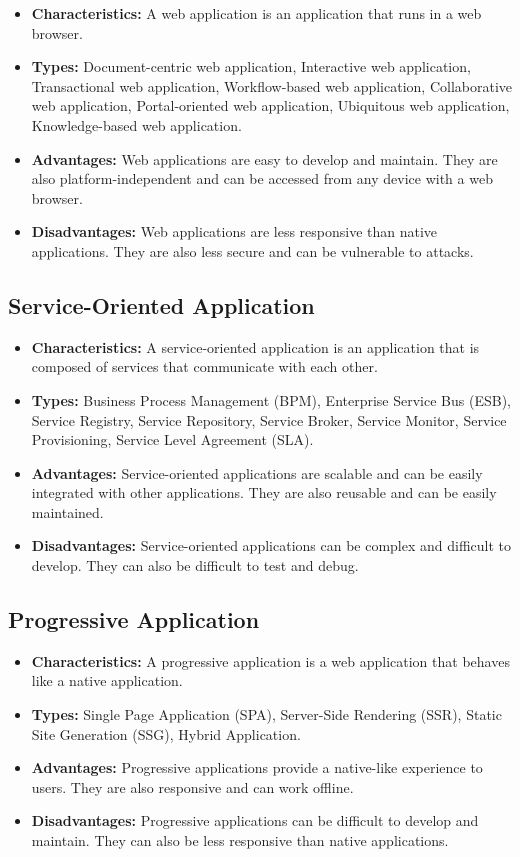 \documentclass{IEEEtran}
\begin{document}
	\begin{itemize}
		\item \textbf{Characteristics:} A web application is an application that runs in a web browser.
		\item \textbf{Types:} Document-centric web application, Interactive web application, Transactional web application, Workflow-based web application, Collaborative web application, Portal-oriented web application, Ubiquitous web application, Knowledge-based web application.
		\item \textbf{Advantages:} Web applications are easy to develop and maintain. They are also platform-independent and can be accessed from any device with a web browser.
		\item \textbf{Disadvantages:} Web applications are less responsive than native applications. They are also less secure and can be vulnerable to attacks.
	\end{itemize}
	
	\subsection{Service-Oriented Application}
	
	\begin{itemize}
		\item \textbf{Characteristics:} A service-oriented application is an application that is composed of services that communicate with each other.
		\item \textbf{Types:} Business Process Management (BPM), Enterprise Service Bus (ESB), Service Registry, Service Repository, Service Broker, Service Monitor, Service Provisioning, Service Level Agreement (SLA).
		\item \textbf{Advantages:} Service-oriented applications are scalable and can be easily integrated with other applications. They are also reusable and can be easily maintained.
		\item \textbf{Disadvantages:} Service-oriented applications can be complex and difficult to develop. They can also be difficult to test and debug.
	\end{itemize}
	
	\subsection{Progressive Application}
	
	\begin{itemize}
		\item \textbf{Characteristics:} A progressive application is a web application that behaves like a native application.
		\item \textbf{Types:} Single Page Application (SPA), Server-Side Rendering (SSR), Static Site Generation (SSG), Hybrid Application.
		\item \textbf{Advantages:} Progressive applications provide a native-like experience to users. They are also responsive and can work offline.
		\item \textbf{Disadvantages:} Progressive applications can be difficult to develop and maintain. They can also be less responsive than native applications.
	\end{itemize}
	
\end{document}
